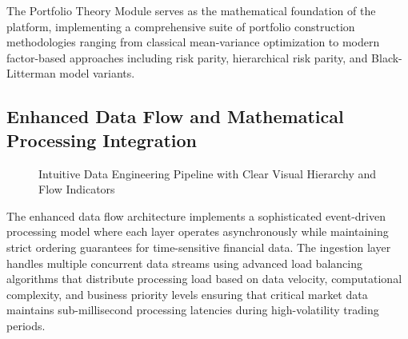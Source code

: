 \documentclass[12pt,a4paper]{article}
\theoremstyle{definition}
\theoremstyle{remark}
\begin{document}
The Portfolio Theory Module serves as the mathematical foundation of the platform, implementing a comprehensive suite of portfolio construction methodologies ranging from classical mean-variance optimization to modern factor-based approaches including risk parity, hierarchical risk parity, and Black-Litterman model variants. \subsection{Enhanced Data Flow and Mathematical Processing Integration}

\begin{figure}[htbp]
\centering
{}
{
}
\caption{Intuitive Data Engineering Pipeline with Clear Visual Hierarchy and Flow Indicators \citep{dean2008mapreduce, kreps2011kafka}}
\label{fig:intuitive_data_flow}
\end{figure}

The enhanced data flow architecture implements a sophisticated event-driven processing model where each layer operates asynchronously while maintaining strict ordering guarantees for time-sensitive financial data. The ingestion layer handles multiple concurrent data streams using advanced load balancing algorithms that distribute processing load based on data velocity, computational complexity, and business priority levels ensuring that critical market data maintains sub-millisecond processing latencies during high-volatility trading periods.
\end{document}
